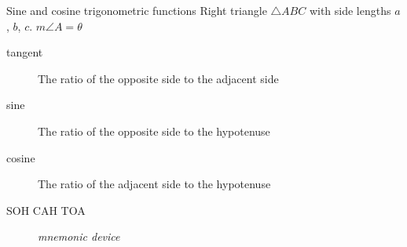 \documentclass[onlytextwidth, aspectratio=169]{beamer}
\begin{document}
\begin{frame}{Sine and cosine trigonometric functions}
  Right triangle $\triangle ABC$ with side lengths $a$, $b$, $c$. $m\angle A = \theta$
  \begin{center}
  \end{center}
  \begin{description}
    \item[tangent] The ratio of the opposite side to the adjacent side
    \item[sine] The ratio of the opposite side to the hypotenuse
    \item[cosine] The ratio of the adjacent side to the hypotenuse
    \item[SOH CAH TOA] \emph{mnemonic device}
  \end{description}
\end{frame}
\end{document}

